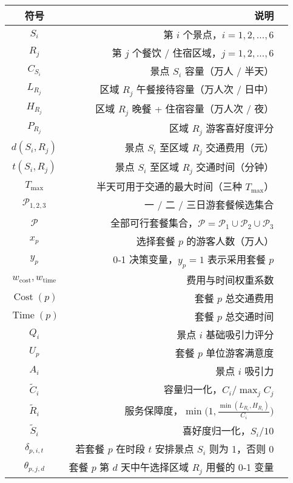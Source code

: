 \begin{table}[htbp]
  \begin{tabularx}{\textwidth}{|C|D|U|}
    \hline
      \textbf{符号} & \textbf{说明}\\
    \hline
    $S_i$ & 第 $i$ 个景点，$i = 1,2,\dots,6$ \\
    $R_j$ & 第 $j$ 个餐饮 / 住宿区域，$j = 1,2,\dots,6$ \\
    $C_{S_i}$ & 景点 $S_i$ 容量（万人 / 半天） \\
    $L_{R_j}$ & 区域 $R_j$ 午餐接待容量（万人次 / 日中） \\
    $H_{R_j}$ & 区域 $R_j$ 晚餐 + 住宿容量（万人次 / 夜） \\
    $P_{R_j}$ & 区域 $R_j$ 游客喜好度评分 \\
    $d(S_i,R_j)$ & 景点 $S_i$ 至区域 $R_j$ 交通费用（元） \\
    $t(S_i,R_j)$ & 景点 $S_i$ 至区域 $R_j$ 交通时间（分钟） \\
    $T_{\max}$   & 半天可用于交通的最大时间（三种 $T_{\max}$） \\
    $\mathcal P_{1,2,3}$ & 一 / 二 / 三日游套餐候选集合 \\
    $\mathcal P$ & 全部可行套餐集合，$\mathcal P=\mathcal P_1\cup\mathcal P_2\cup\mathcal P_3$ \\
    $x_p$ & 选择套餐 $p$ 的游客人数（万人） \\
    $y_p$ & 0‑1 决策变量，$y_p = 1$ 表示采用套餐 $p$ \\
    $w_{\text{cost}}, w_{\text{time}}$ & 费用与时间权重系数 \\
    $\operatorname{Cost}(p)$ & 套餐 $p$ 总交通费用 \\
    $\operatorname{Time}(p)$ & 套餐 $p$ 总交通时间 \\
    $Q_i$ & 景点 $i$ 基础吸引力评分 \\
    $U_p$ & 套餐 $p$ 单位游客满意度 \\
    $A_i$ & 景点 $i$ 吸引力 \\
    $\tilde C_i$ & 容量归一化，$C_i/\max_j C_j$ \\
    $\tilde R_i$ & 服务保障度，$\min\!\bigl(1,\frac{\min(L_{R_i},H_{R_i})}{C_i}\bigr)$ \\
    $\tilde S_i$ & 喜好度归一化，$S_i/10$ \\
    $\delta_{p,i,t}$ & 若套餐 $p$ 在时段 $t$ 安排景点 $S_i$ 则为 1，否则 0 \\
    $\theta_{p,j,d}$ & 套餐 $p$ 第 $d$ 天中午选择区域 $R_j$ 用餐的 0‑1 变量 \\

\end{tabularx}
\end{table}
